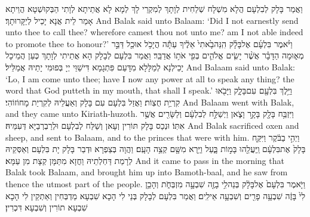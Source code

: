 {וַאֲמַר בָּלָק לְבִלְעָם הֲלָא מִשְׁלָח שְׁלַחִית לְוָתָךְ לְמִקְרֵי לָךְ לְמָא לָא אֲתֵיתָא לְוָתִי הַבְּקוּשְׁטָא הֲוֵיתָא אָמַר לֵית אֲנָא יָכֵיל לְיַקָּרוּתָךְ׃}
{And Balak said unto Balaam: ‘Did I not earnestly send unto thee to call thee? wherefore camest thou not unto me? am I not able indeed to promote thee to honour?’}{}
{וַיֹּ֨אמֶר בִּלְעָ֜ם אֶל\maqqaf בָּלָ֗ק הִֽנֵּה\maqqaf בָ֙אתִי֙ אֵלֶ֔יךָ עַתָּ֕ה הֲיָכֹ֥ל אוּכַ֖ל דַּבֵּ֣ר מְא֑וּמָה הַדָּבָ֗ר אֲשֶׁ֨ר יָשִׂ֧ים אֱלֹהִ֛ים בְּפִ֖י אֹת֥וֹ אֲדַבֵּֽר׃}
{וַאֲמַר בִּלְעָם לְבָלָק הָא אֲתֵיתִי לְוָתָךְ כְּעַן הֲמֵיכָל יָכֵילְנָא לְמַלָּלָא מִדָּעַם פִּתְגָמָא דִּישַׁוֵּי יְיָ בְּפוּמִּי יָתֵיהּ אֲמַלֵּיל׃}
{And Balaam said unto Balak: ‘Lo, I am come unto thee; have I now any power at all to speak any thing? the word that God putteth in my mouth, that shall I speak.’}{}
{וַיֵּ֥לֶךְ בִּלְעָ֖ם עִם\maqqaf בָּלָ֑ק וַיָּבֹ֖אוּ קִרְיַ֥ת חֻצֽוֹת׃}
{וַאֲזַל בִּלְעָם עִם בָּלָק וְאַעֲלֵיהּ לְקִרְיַת מָחוֹזוֹהִי׃}
{And Balaam went with Balak, and they came unto Kiriath-huzoth.}{}
{וַיִּזְבַּ֥ח בָּלָ֖ק בָּקָ֣ר וָצֹ֑אן וַיְשַׁלַּ֣ח לְבִלְעָ֔ם וְלַשָּׂרִ֖ים אֲשֶׁ֥ר אִתּֽוֹ׃}
{וּנְכַס בָּלָק תּוֹרִין וְעָאן וְשַׁלַּח לְבִלְעָם וּלְרַבְרְבַיָּא דְּעִמֵּיהּ׃}
{And Balak sacrificed oxen and sheep, and sent to Balaam, and to the princes that were with him.}{}
{וַיְהִ֣י בַבֹּ֔קֶר וַיִּקַּ֤ח בָּלָק֙ אֶת\maqqaf בִּלְעָ֔ם וַֽיַּעֲלֵ֖הוּ בָּמ֣וֹת בָּ֑עַל וַיַּ֥רְא מִשָּׁ֖ם קְצֵ֥ה הָעָֽם׃}
{וַהֲוָה בְּצַפְרָא וּדְבַר בָּלָק יָת בִּלְעָם וְאַסְּקֵיהּ לְרָמַת דַּחְלְתֵיהּ וַחֲזָא מִתַּמָּן קְצָת מִן עַמָּא׃}
{And it came to pass in the morning that Balak took Balaam, and brought him up into Bamoth-baal, and he saw from thence the utmost part of the people.}{}
\newperek
{}%
{וַיֹּ֤אמֶר בִּלְעָם֙ אֶל\maqqaf בָּלָ֔ק בְּנֵה\maqqaf לִ֥י בָזֶ֖ה שִׁבְעָ֣ה מִזְבְּחֹ֑ת וְהָכֵ֥ן לִי֙ בָּזֶ֔ה שִׁבְעָ֥ה פָרִ֖ים וְשִׁבְעָ֥ה אֵילִֽים׃}
{וַאֲמַר בִּלְעָם לְבָלָק בְּנֵי לִי הָכָא שִׁבְעָא מַדְבְּחִין וְאַתְקֵין לִי הָכָא שִׁבְעָא תוֹרִין וְשִׁבְעָא דִּכְרִין׃}
